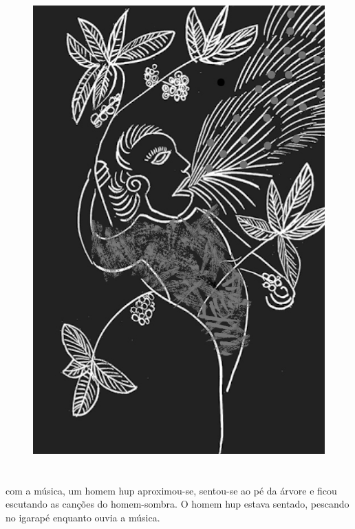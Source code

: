 \begin{figure}
\vspace*{-1.5cm}
\hspace*{-2.4cm}\includegraphics[width=142mm]{./imgs/img1.jpg}
\end{figure}

\chapter*{}

\mbox{}\vspace*{\fill}

 com a música,
um homem hup aproximou-se,
sentou-se ao pé da
árvore e ficou escutando as
canções do homem-sombra. O
homem hup estava sentado,
pescando no igarapé
enquanto ouvia a música.

